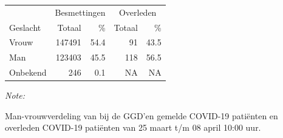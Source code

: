 \documentclass[
  english,
  man,floatsintext]{apa6}
\begin{document}
\newpage

\begin{table}
\centering\begingroup\fontsize{11}{13}\selectfont

\begin{threeparttable}
\begin{tabular}{lrrrr}
\toprule
\multicolumn{1}{c}{ } & \multicolumn{2}{c}{Besmettingen} & \multicolumn{2}{c}{Overleden} \\
\cmidrule(l{3pt}r{3pt}){2-3} \cmidrule(l{3pt}r{3pt}){4-5}
Geslacht & Totaal & \% & Totaal & \%\\
\midrule
Vrouw & 147491 & 54.4 & 91 & 43.5\\
Man & 123403 & 45.5 & 118 & 56.5\\
Onbekend & 246 & 0.1 & NA & NA\\
\bottomrule
\end{tabular}
\begin{tablenotes}
\item \textit{Note: } 
\item Man-vrouwverdeling van bij de GGD’en gemelde COVID-19 patiënten en overleden COVID-19 patiënten van 25 maart t/m 08 april 10:00 uur.
\end{tablenotes}
\end{threeparttable}
\endgroup{}
\end{table}
\newpage
\end{document}
